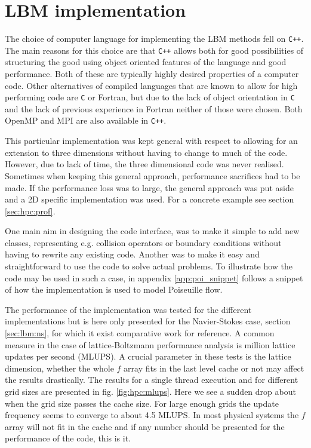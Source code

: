 \section{LBM implementation}
The choice of computer language for implementing the LBM methods fell
on \verb!C++!. The main reasons for this choice are that \texttt{C++}
allows both for good possibilities of structuring the good using
object oriented features of the language and good performance. Both of
these are typically highly desired properties of a computer
code. Other alternatives of compiled languages that are known to allow
for high performing code are \texttt{C} or Fortran, but due to the
lack of object orientation in \texttt{C} and the lack of previous
experience in Fortran neither of those were chosen. Both OpenMP and
MPI are also available in \texttt{C++}.

This particular implementation was kept general with respect to
allowing for an extension to three dimensions without having to change
to much of the code. However, due to lack of time, the three
dimensional code was never realised. Sometimes when keeping this
general approach, performance sacrifices had to be made. If the
performance loss was to large, the general approach was put aside and
a 2D specific implementation was used. For a concrete example see
section \ref{sec:hpc:prof}.

One main aim in designing the code interface, was to make it simple to
add new classes, representing e.g. collision operators or boundary
conditions without having to rewrite any existing code. Another was to
make it easy and straightforward to use the code to solve actual
problems. To illustrate how the code may be used in such a case, in
appendix \ref{app:poi_snippet} follows a snippet of how the
implementation is used to model Poiseuille flow.

The performance of the implementation was tested for the different
implementations but is here only presented for the Navier-Stokes case,
section \ref{sec:lbm:ns}, for which it exist comparative work for
reference. A common measure in the case of lattice-Boltzmann
performance analysis is million lattice updates per second (MLUPS). A
crucial parameter in these tests is the lattice dimension, whether the
whole $f$ array fits in the last level cache or not may affect the
results drastically. The results for a single thread execution and for
different grid sizes are presented in fig. \ref{fig:hpc:mlups}. Here
we see a sudden drop about when the grid size passes the cache
size. For large enough grids the update frequency seems to converge to
about 4.5 MLUPS. In most physical systems the $f$ array will not fit
in the cache and if any number should be presented for the performance
of the code, this is it.

